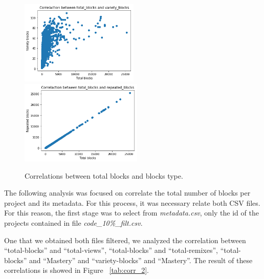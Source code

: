 \documentclass[a4paper,twocolumn,10pt]{article}
\begin{document}
\begin{figure}
\includegraphics[height=4cm]{images/1.png}
\includegraphics[height=4cm]{images/2.png}
\caption{Correlations between total blocks and blocks type.}
\label{tab:corr_1}
\end{figure}

The following analysis was focused on correlate the total number of blocks per project
and its metadata. For this process, it was necessary relate both CSV files. For this
reason, the first stage was to select from \textit{metadata.csv}, only the id of the
projects contained in file \textit{code\_10\%\_filt.csv}.\par
One that we obtained both files filtered, we analyzed the correlation between 
``total-blocks'' and ``total-views'', ``total-blocks'' and ``total-remixes'', 
``total-blocks'' and ``Mastery'' and ``variety-blocks'' and ``Mastery''. The result
of these correlations is showed in Figure ~\ref{tab:corr_2}.\par
\end{document}

